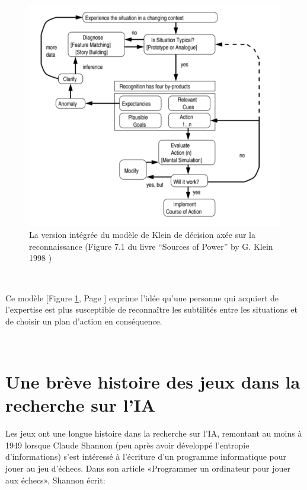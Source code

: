\begin{figure}[th]
\centering
\includegraphics{Figures/klein.PNG}
\decoRule
\caption[ La version intégrée  du modèle de Klein de décision axée sur la reconnaissance] { La version intégrée  du modèle de Klein de décision axée sur la reconnaissance
(Figure 7.1 du livre “Sources of Power” by G. Klein 1998 \parencite{klein2017sources}) }
\label{fig:klein}
\end{figure}


~\par
Ce modèle [Figure \ref{fig:klein}, Page \pageref{fig:klein}] exprime l’idée qu’une personne qui acquiert de l’expertise est plus susceptible 
de reconnaître les subtilités entre les situations et de choisir un plan d’action en conséquence.



~\par

\section{Une brève histoire des jeux dans la recherche sur l'IA}

Les jeux ont une longue histoire dans la recherche sur l'IA, remontant au moins à 1949 lorsque Claude Shannon (peu après avoir développé l'entropie d'informations) s'est intéressé à l'écriture d'un programme informatique pour jouer au jeu d'échecs. Dans son article «Programmer un ordinateur pour jouer aux échecs», Shannon écrit:

